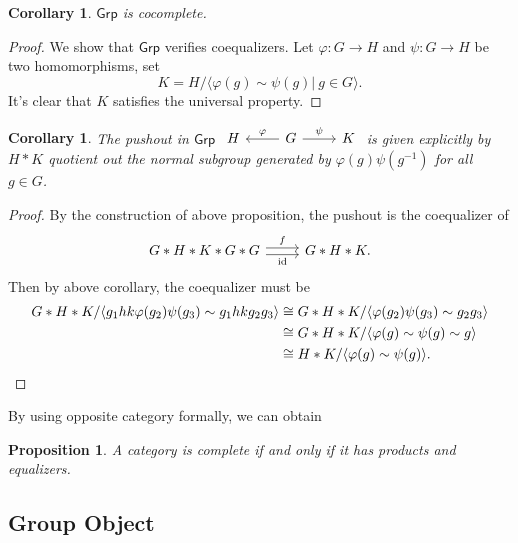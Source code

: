 \documentclass[a4paper]{amsart}
\theoremstyle{plain}
\newtheorem{prop}[thm]{Proposition}
\newtheorem{cor}[thm]{Corollary}
\theoremstyle{definition}
\theoremstyle{remark}
\begin{document}
\begin{cor}
    $\mathsf{Grp}$ is cocomplete.
\end{cor}
\begin{proof}
    We show that $\mathsf{Grp}$ verifies coequalizers.
    Let $\varphi:G\to H$ and $\psi:G\to H$ be two homomorphisms, set
    \[K=H/\langle\varphi(g)\sim\psi(g)|\ g\in G\rangle.\]
    It's clear that $K$ satisfies the universal property.
\end{proof}

\begin{cor}
    The pushout in $\mathsf{Grp}$ 
    $\begin{tikzcd}
        H & G \ar[l,"\varphi"'] \ar[r, "\psi"] & K
    \end{tikzcd}$
    is given explicitly by $H*K$ quotient out the normal subgroup generated by $\varphi(g)\psi(g^{-1})$ for all $g\in G$.
\end{cor}
\begin{proof}
    By the construction of above proposition, the pushout is the coequalizer of
    \[\begin{tikzcd}
        G*H*K*G*G \ar[r,shift left, "f"] \ar[r,shift right, "\operatorname{id}"'] & G*H*K.
    \end{tikzcd}\]
    Then by above corollary, the coequalizer must be
    \begin{align*}
        G*H*K/\langle g_1hk\varphi(g_2)\psi(g_3)\sim g_1hkg_2g_3\rangle&\cong G*H*K/\langle\varphi(g_2)\psi(g_3)\sim g_2g_3\rangle\\
        &\cong G*H*K/\langle\varphi(g)\sim\psi(g)\sim g\rangle\\
        &\cong H*K/\langle\varphi(g)\sim\psi(g)\rangle.\qedhere
    \end{align*}
\end{proof}

By using opposite category formally, we can obtain
\begin{prop}
    A category is complete if and only if it has products and equalizers.
\end{prop}

\subsection{Group Object}
\end{document}
